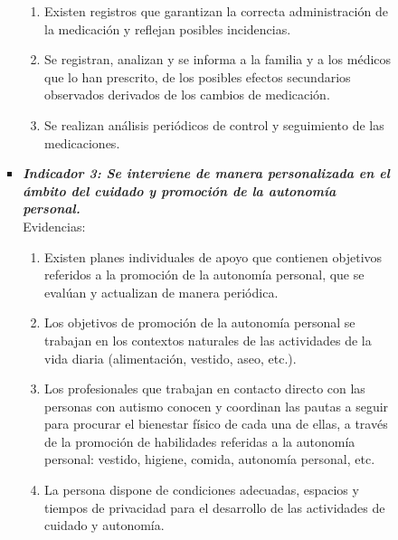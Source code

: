 \begin{itemize}
\begin{itemize}
\begin{itemize}
\begin{itemize}
\begin{enumerate}
					\item Existen registros que garantizan la correcta administración de la medicación y reflejan posibles incidencias. 
					\item Se registran, analizan y se informa a la familia y a los médicos que lo han prescrito, de los posibles efectos secundarios observados derivados de los cambios de medicación. 
					\item Se realizan análisis periódicos de control y seguimiento de las medicaciones.
				\end{enumerate}
				\item \textbf{\textit{Indicador 3: Se interviene de manera personalizada en el ámbito del cuidado y promoción de la autonomía personal.}}\\Evidencias:
				\begin{enumerate}
					\item Existen planes individuales de apoyo que contienen objetivos referidos a la promoción de la autonomía personal, que se evalúan y actualizan de manera periódica.  
					\item Los objetivos de promoción de la autonomía personal se trabajan en los contextos naturales de las actividades de la vida diaria (alimentación, vestido, aseo, etc.).
					\item Los profesionales que trabajan en contacto directo con las personas con autismo conocen y coordinan las pautas a seguir para procurar el bienestar físico de cada una de ellas, a través de la promoción de habilidades referidas a la autonomía personal: vestido, higiene, comida, autonomía personal, etc. 
					\item La persona dispone de condiciones adecuadas, espacios y tiempos de privacidad para el desarrollo de las actividades de cuidado y autonomía. 
					 

\end{enumerate}
\end{itemize}
\end{itemize}
\end{itemize}
\end{itemize}
